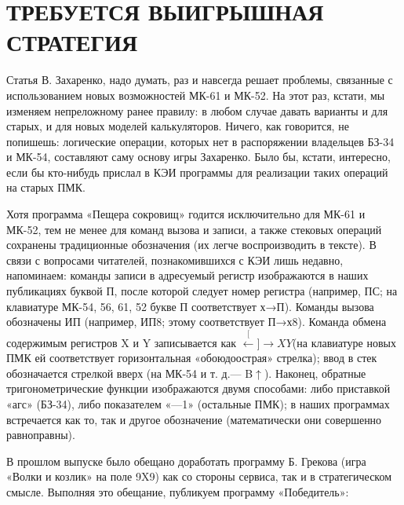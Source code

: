 \documentclass[11pt,a4paper,oneside]{article}
\def\XY{$\stackrel[\leftarrow]{\rightarrow}{XY}$}
\begin{document}
\section{ТРЕБУЕТСЯ ВЫИГРЫШНАЯ СТРАТЕГИЯ}
Статья В. Захаренко, надо думать, раз и навсегда решает проблемы, связанные с использованием новых возможностей МК-61 и МК-52. На этот раз, кстати, мы изменяем непреложному ранее правилу: в любом случае давать варианты и для старых, и для новых моделей калькуляторов. Ничего, как говорится, не попишешь: логические операции, которых нет в распоряжении владельцев БЗ-34 и МК-54, составляют саму основу игры Захаренко. Было бы, кстати, интересно, если бы кто-нибудь прислал в КЭИ программы для реализации таких операций на старых ПМК. 

Хотя программа «Пещера сокровищ» годится исключительно для МК-61 и МК-52, тем не менее для команд вызова и записи, а также стековых операций сохранены традиционные обозначения (их легче воспроизводить в тексте). В связи с вопросами читателей, познакомившихся с КЭИ лишь недавно, напоминаем: команды записи в адресуемый регистр изображаются в наших публикациях буквой П, после которой следует номер регистра (например, ПС; на клавиатуре МК-54, 56, 61, 52 букве П соответствует х→П). Команды вызова обозначены ИП (например, ИП8; этому соответствует П→х8). Команда обмена содержимым регистров X и Y записывается как \XY (на клавиатуре новых ПМК ей соответствует горизонтальная «обоюдоострая» стрелка); ввод в стек обозначается стрелкой вверх (на МК-54 и т. д.— B$\uparrow$). Наконец, обратные тригонометрические функции изображаются двумя способами: либо приставкой «агс» (БЗ-34), либо показателем «—1» (остальные ПМК); в наших программах встречается как то, так и другое обозначение (математически они совершенно равноправны).

В прошлом выпуске было обещано доработать программу Б. Грекова (игра «Волки и козлик» на поле 9X9) как со стороны сервиса, так и в стратегическом смысле. Выполняя это обещание, публикуем программу «Победитель»:
\end{document}
